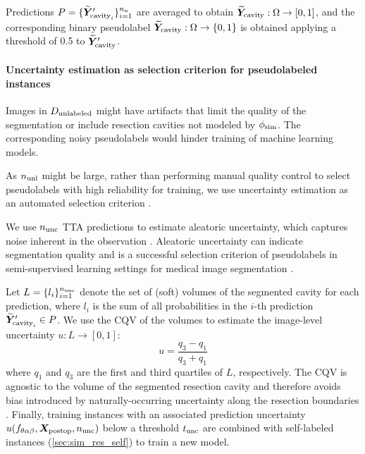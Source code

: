 Predictions $P = \{ \widetilde{\bm{Y}}'_{\text{cavity}_i} \}_{i=1}^{n_{\textnormal{u}}}$ are averaged to obtain $\widetilde{\bm{Y}}_{\textnormal{cavity}} : \Omega \to [0, 1]$, and the corresponding binary pseudolabel $\widetilde{\bm{Y}}_{\textnormal{cavity}} : \Omega \to  \{ 0, 1 \}$ is obtained applying a threshold of 0.5 to $\widetilde{\bm{Y}}'_{\textnormal{cavity}}$.


\paragraph{Uncertainty estimation as selection criterion for pseudolabeled instances}

Images in $D_{\textnormal{unlabeled}}$ might have artifacts that limit the quality of the segmentation or include resection cavities not modeled by $\phi_{\textnormal{sim}}$.
The corresponding noisy pseudolabels would hinder training of machine learning models.

As $n_{\textnormal{unl}}$ might be large, rather than performing manual quality control to select pseudolabels with high reliability for training, we use uncertainty estimation as an automated selection criterion \cite{venturini_uncertainty_2020}.

We use $n_{\textnormal{unc}}$ \ac{TTA} predictions to estimate aleatoric uncertainty, which captures noise inherent in the observation \cite{kendall_what_2017}.
Aleatoric uncertainty can indicate segmentation quality and is a successful selection criterion of pseudolabels in semi-supervised learning settings for medical image segmentation \cite{wang_aleatoric_2019,venturini_uncertainty_2020}.

Let $L = \{ l_i \}_{i = 1}^{n_{\textnormal{unc}}}$ denote the set of (soft) volumes of the segmented cavity for each prediction, where $l_i$ is the sum of all probabilities in the $i$-th prediction $\widetilde{\bm{Y}}'_{\text{cavity}_i} \in P$.
We use the \ac{CQV} of the volumes \cite{zwillinger_crc_1999,wang_aleatoric_2019} to estimate the image-level uncertainty $u : L \to \left[0, 1\right]$:
\begin{equation}
    u = \frac{q_3 - q_1}{q_3 + q_1}
\end{equation}
where $q_1$ and $q_3$ are the first and third quartiles of $L$, respectively.
The \ac{CQV} is agnostic to the volume of the segmented resection cavity and therefore avoids bias introduced by naturally-occurring uncertainty along the resection boundaries \cite{jungo_analyzing_2020}.
Finally, training instances with an associated prediction uncertainty $u(f_{\theta\alpha\beta}, \bm{X}_{\textnormal{postop}}, n_{\textnormal{unc}})$ below a threshold $t_{\textnormal{unc}}$ are combined with self-labeled instances (\cref{sec:sim_res_self}) to train a new model.
